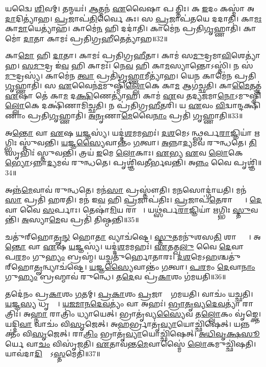 𑌯𑌦𑍍𑌵𑍈 \ul{𑌶𑌿}𑌵𑌮𑍍।
𑌤𑌨𑍍𑌮𑌯𑌃॑।
\ul{𑌆}𑌤𑍍𑌮𑌨॑ \ul{𑌏}𑌵𑍈𑌷𑌾 𑌪𑌰𑍀᳚𑌤𑍍𑌤𑌿𑌃।
𑌕 \ul{𑌇}𑌦𑌂 𑌕𑌸𑍍𑌮𑌾॑ 𑌅\ul{𑌦𑌾}𑌦𑌿𑌤𑍍𑌯𑌾॑𑌹।
\ul{𑌪𑍍𑌰}𑌜𑌾𑌪॑\ul{𑌤𑌿}𑌰𑍍𑌵𑍈 𑌕𑌃।
𑌸 \ul{𑌪𑍍𑌰}𑌜𑌾𑌪॑𑌤𑌯𑍇 𑌦𑌦𑌾𑌤𑌿।
𑌕𑌾\ul{𑌮𑌃} 𑌕𑌾\ul{𑌮𑌾}𑌯𑍇𑌤𑍍𑌯𑌾॑𑌹।
𑌕𑌾𑌮𑍇॑\ul{𑌨} 𑌹𑌿 𑌦𑌦𑌾॑𑌤𑌿।
𑌕𑌾𑌮𑍇॑𑌨 𑌪𑍍𑌰𑌤𑌿\ul{𑌗𑍃}𑌹𑍍𑌣𑌾𑌤𑌿॑।
𑌕𑌾𑌮𑍋॑ \ul{𑌦𑌾}𑌤𑌾 𑌕𑌾𑌮𑌃॑ 𑌪𑍍𑌰𑌤𑌿𑌗𑍍𑌰\ul{𑌹𑍀}𑌤𑍇𑌤𑍍𑌯𑌾॑𑌹॥32॥

𑌕𑌾\ul{𑌮𑍋} 𑌹𑌿 \ul{𑌦𑌾}𑌤𑌾।
𑌕𑌾𑌮𑌃॑ 𑌪𑍍𑌰𑌤𑌿𑌗𑍍𑌰\ul{𑌹𑍀}𑌤𑌾।
𑌕𑌾𑌮॑ 𑌸\ul{𑌮𑍁}𑌦𑍍𑌰𑌮𑌾\ul{𑌵𑌿}𑌶𑍇\-𑌤𑍍𑌯𑌾॑𑌹।
\ul{𑌸}\ul{𑌮𑍁}𑌦𑍍𑌰 𑌇॑\ul{𑌵} 𑌹𑌿 𑌕𑌾𑌮𑌃॑।
𑌨𑍇\ul{𑌵} 𑌹𑌿 𑌕𑌾\ul{𑌮}𑌸𑍍𑌯𑌾𑌨𑍍𑌤𑍋\-𑌽𑌸𑍍𑌤𑌿॑।
𑌨 𑌸॑\ul{𑌮𑍁}𑌦𑍍𑌰𑌸𑍍𑌯॑।
𑌕𑌾𑌮𑍇॑𑌨 \ul{𑌤𑍍𑌵𑌾} 𑌪𑍍𑌰𑌤𑌿॑\-𑌗𑍃\ul{𑌹𑍍𑌣𑌾}𑌮𑍀𑌤𑍍𑌯𑌾॑𑌹।
𑌯𑍇\ul{𑌨} 𑌕𑌾𑌮𑍇॑𑌨 𑌪𑍍𑌰𑌤𑌿\ul{𑌗𑍃}𑌹𑍍𑌣𑌾𑌤𑌿॑।
𑌸 \ul{𑌏}𑌵𑍈𑌨॑\ul{𑌮}𑌮𑍁𑌷𑍍𑌮𑌿𑌁॑\ul{𑌲𑍍𑌲𑍋}𑌕𑍇 𑌕𑌾\ul{𑌮} 𑌆𑌗॑𑌚𑍍𑌛𑌤𑌿।
𑌕𑌾\ul{𑌮𑍈}𑌤𑌤𑍍𑌤॑ \ul{𑌏}𑌷𑌾 𑌤𑍇॑ 𑌕𑌾\ul{𑌮} 𑌦\ul{𑌕𑍍𑌷𑌿}𑌣𑍇𑌤𑍍𑌯𑌾॑𑌹।
𑌕𑌾𑌮॑ \ul{𑌏}𑌵 𑌤𑌦𑍍𑌯𑌜॑𑌮𑌾\ul{𑌨𑍋}\-𑌽𑌮𑍁𑌷𑍍𑌮𑌿𑌁॑\ul{𑌲𑍍𑌲𑍋}𑌕𑍇 𑌦𑌕𑍍𑌷𑌿॑𑌣𑌾𑌮𑌿𑌚𑍍𑌛𑌤𑌿।
𑌨 𑌪𑍍𑌰॑𑌤𑌿𑌗𑍍𑌰\ul{𑌹𑍀}𑌤𑌰𑌿॑।
𑌯 \ul{𑌏}𑌵𑌂 \ul{𑌵𑌿}𑌦𑍍𑌵𑌾𑌨𑍍𑌦𑌕𑍍𑌷𑌿॑𑌣𑌾𑌂 𑌪𑍍𑌰𑌤𑌿\ul{𑌗𑍃}𑌹𑍍𑌣𑌾𑌤𑌿॑।
\ul{𑌅}\ul{𑌨𑍃}𑌣𑌾\ul{𑌮𑍇}𑌵𑍈\ul{𑌨𑌾𑌂} 𑌪𑍍𑌰𑌤𑌿॑ 𑌗𑍃𑌹𑍍𑌣𑌾𑌤𑌿॥33॥\anuvakamend[\ul{𑌵𑍍𑌲𑍀}\ul{𑌨𑌾}𑌤𑍍𑌯\ul{𑌶𑍍𑌵}𑌮𑌿𑌤𑍍𑌯𑌾॑𑌹𑌾𑌙𑍍𑌗𑍀\ul{𑌰}𑌸𑌃 𑌪𑍍𑌰॑𑌤𑌿𑌗𑍍𑌰\ul{𑌹𑍀}𑌤𑍍𑌰 𑌇𑌤𑍍𑌯𑌾॑𑌹 𑌪𑍍𑌰𑌤𑌿𑌗𑍍𑌰\ul{𑌹𑍀}𑌤𑍇𑌤𑍍𑌯𑌾॑\ul{𑌹} 𑌦\ul{𑌕𑍍𑌷𑌿}𑌣𑍇𑌤𑍍𑌯𑌾॑𑌹 \ul{𑌚}𑌤𑍍𑌵𑌾𑌰𑌿॑ 𑌚]

𑌅\ul{𑌨𑍍𑌤𑍋} 𑌵𑌾 \ul{𑌏}𑌷 \ul{𑌯}𑌜𑍍𑌞𑌸𑍍𑌯॑।
𑌯𑌦𑍍𑌦॑\ul{𑌶}𑌮𑌮𑌹𑌃॑।
\ul{𑌦}\ul{𑌶}𑌮𑍇\-𑌽𑌹᳚𑌨𑍍𑌥𑍍𑌸𑌰𑍍𑌪\ul{𑌰𑌾}𑌜𑍍𑌞𑌿𑌯𑌾॑ \ul{𑌋}𑌗𑍍𑌭𑌿𑌃 𑌸𑍍𑌤𑍁॑𑌵𑌨𑍍𑌤𑌿।
\ul{𑌯}𑌜𑍍𑌞\ul{𑌸𑍍𑌯𑍈}𑌵𑌾𑌨𑍍𑌤𑌂॑ \ul{𑌗}𑌤𑍍𑌵𑌾।
\ul{𑌅}𑌨𑍍𑌨𑌾\ul{𑌦𑍍𑌯}𑌮𑌵॑ 𑌰𑍁𑌨𑍍𑌧𑌤𑍇।
\ul{𑌤𑌿}𑌸𑍃𑌭𑌿𑌃॑ 𑌸𑍍𑌤𑍁𑌵𑌨𑍍𑌤𑌿।
𑌤𑍍𑌰𑌯॑ \ul{𑌇}𑌮𑍇 \ul{𑌲𑍋}𑌕𑌾𑌃।
\ul{𑌏}𑌭𑍍𑌯 \ul{𑌏}𑌵 \ul{𑌲𑍋}𑌕𑍇\ul{𑌭𑍍𑌯𑍋}\-𑌽𑌨𑍍𑌨𑌾\ul{𑌦𑍍𑌯}𑌮𑌵॑ 𑌰𑍁𑌨𑍍𑌧𑌤𑍇।
𑌪𑍃𑌶𑍍𑌞𑌿॑𑌵𑌤𑍀𑌰𑍍𑌭𑌵𑌨𑍍𑌤𑌿।
𑌅\ul{𑌨𑍍𑌨𑌂} 𑌵𑍈 𑌪𑍃𑌶𑍍𑌞𑌿॑॥34॥

𑌅𑌨𑍍𑌨॑\ul{𑌮𑍇}𑌵𑌾𑌵॑ 𑌰𑍁𑌨𑍍𑌧𑌤𑍇।
𑌮𑌨॑\ul{𑌸𑌾} 𑌪𑍍𑌰𑌸𑍍𑌤𑍗॑𑌤𑌿।
𑌮\ul{𑌨}𑌸𑍋𑌦𑍍𑌗𑌾॑𑌯𑌤𑌿।
𑌮𑌨॑\ul{𑌸𑌾} 𑌪𑍍𑌰𑌤𑌿॑ 𑌹𑌰𑌤𑌿।
𑌮𑌨॑ 𑌇\ul{𑌵} 𑌹𑌿 \ul{𑌪𑍍𑌰}𑌜𑌾𑌪॑𑌤𑌿𑌃।
\ul{𑌪𑍍𑌰}𑌜𑌾𑌪॑\ul{𑌤𑍇}𑌰𑌾𑌪𑍍𑌤𑍍𑌯𑍈᳚।
\ul{𑌦𑍇}𑌵𑌾 𑌵𑍈 \ul{𑌸}𑌰𑍍𑌪𑌾𑌃।
𑌤𑍇𑌷𑌾॑\ul{𑌮𑌿}𑌯 𑌰𑌾𑌜𑍍𑌞𑍀᳚।
𑌯𑌥𑍍𑌸॑𑌰𑍍𑌪\ul{𑌰𑌾}𑌜𑍍𑌞𑌿𑌯𑌾॑ \ul{𑌋}𑌗𑍍𑌭𑌿𑌃 \ul{𑌸𑍍𑌤𑍁}𑌵𑌨𑍍𑌤𑌿॑।
\ul{𑌅}𑌸𑍍𑌯𑌾\ul{𑌮𑍇}𑌵 𑌪𑍍𑌰𑌤𑌿॑ 𑌤𑌿𑌷𑍍𑌠𑌨𑍍𑌤𑌿॥35॥

𑌚𑌤𑍁॑𑌰𑍍‌\mbox{}𑌹𑍋\ul{𑌤𑍄}\ul{𑌨𑍍} 𑌹𑍋\ul{𑌤𑌾} 𑌵𑍍𑌯𑌾𑌚॑𑌷𑍍𑌟𑍇।
\ul{𑌸𑍍𑌤𑍁}𑌤𑌮𑌨𑍁॑𑌶𑌸\ul{𑌤𑌿} 𑌶𑌾𑌨𑍍𑌤𑍍𑌯𑍈᳚।
𑌅\ul{𑌨𑍍𑌤𑍋} 𑌵𑌾 \ul{𑌏}𑌷 \ul{𑌯}𑌜𑍍𑌞𑌸𑍍𑌯॑।
𑌯𑌦𑍍𑌦॑\ul{𑌶}𑌮𑌮𑌹𑌃॑।
\ul{𑌏}𑌤𑌤𑍍𑌖\ul{𑌲𑍁} 𑌵𑍈 \ul{𑌦𑍇}𑌵𑌾𑌨𑌾𑌂᳚ 𑌪\ul{𑌰}𑌮𑌂 𑌗𑍁\ul{𑌹𑍍𑌯𑌂} 𑌬𑍍𑌰𑌹𑍍𑌮॑।
𑌯𑌚𑍍𑌚𑌤𑍁॑𑌰𑍍\mbox{}𑌹𑍋𑌤𑌾𑌰𑌃।
\ul{𑌦}\ul{𑌶}𑌮𑍇\-𑌽\ul{𑌹}\ul{}𑌶𑍍𑌚𑌤𑍁॑𑌰𑍍\-‌𑌹𑍋\ul{𑌤𑍄}𑌨𑍍𑌵𑍍𑌯𑌾𑌚॑𑌷𑍍𑌟𑍇।
\ul{𑌯}𑌜𑍍𑌞\ul{𑌸𑍍𑌯𑍈}𑌵𑌾𑌨𑍍𑌤𑌂॑ \ul{𑌗}𑌤𑍍𑌵𑌾।
\ul{𑌪}\ul{𑌰}𑌮𑌂 \ul{𑌦𑍇}𑌵𑌾\ul{𑌨𑌾𑌂} 𑌗𑍁\ul{𑌹𑍍𑌯𑌂} 𑌬𑍍𑌰𑌹𑍍𑌮𑌾𑌵॑ 𑌰𑍁𑌨𑍍𑌧𑍇।
𑌤\ul{𑌦𑍇}𑌵 𑌪𑍍𑌰॑\ul{𑌕𑌾}𑌶𑌂 𑌗॑𑌮𑌯𑌤𑌿॥36॥

𑌤𑌦𑍇॑𑌨𑌂 𑌪𑍍𑌰\ul{𑌕𑌾}𑌶𑌂 \ul{𑌗}𑌤𑌮𑍍।
\ul{𑌪𑍍𑌰}\ul{𑌕𑌾}𑌶𑌂 \ul{𑌪𑍍𑌰}𑌜𑌾𑌨𑌾𑌂᳚ 𑌗𑌮𑌯𑌤𑌿।
𑌵𑌾𑌚𑌂॑ 𑌯𑌚𑍍𑌛𑌤𑌿।
\ul{𑌯}𑌜𑍍𑌞\ul{𑌸𑍍𑌯} 𑌧𑍃𑌤𑍍𑌯𑍈᳚।
\ul{𑌯}\ul{𑌜}\ul{𑌮𑌾}\ul{𑌨}\ul{𑌦𑍇}\ul{𑌵}𑌤𑍍𑌯𑌂॑ 𑌵𑌾 𑌅𑌹𑌃॑।
\ul{𑌭𑍍𑌰𑌾}\ul{𑌤𑍃}\ul{𑌵𑍍𑌯}\ul{𑌦𑍇}\ul{𑌵}𑌤𑍍𑌯𑌾॑ 𑌰𑌾𑌤𑍍𑌰𑌿𑌃॑।
𑌅\ul{𑌹𑍍𑌨𑌾} 𑌰𑌾𑌤𑍍𑌰𑌿𑌂॑ 𑌧𑍍𑌯𑌾𑌯𑍇𑌤𑍍।
𑌭𑍍𑌰𑌾𑌤𑍃॑𑌵𑍍𑌯\ul{𑌸𑍍𑌯𑍈}𑌵 𑌤\ul{𑌲𑍍𑌲𑍋}𑌕𑌂 𑌵𑍃॑𑌙𑍍𑌕𑍍𑌤𑍇।
𑌯𑌦𑍍𑌦𑌿\ul{𑌵𑌾} 𑌵𑌾𑌚𑌂॑ 𑌵𑌿\ul{𑌸𑍃}𑌜𑍇𑌤𑍍।
𑌅\ul{𑌹}𑌰𑍍𑌭𑍍𑌰𑌾𑌤𑍃॑\ul{𑌵𑍍𑌯𑌾}𑌯𑍋𑌚𑍍𑌛𑌿॑𑌷𑍇𑌤𑍍।
𑌯𑌨𑍍𑌨𑌕𑍍𑌤𑌂॑ 𑌵𑌿\ul{𑌸𑍃}𑌜𑍇𑌤𑍍।
𑌰𑌾\ul{𑌤𑍍𑌰𑌿𑌂} 𑌭𑍍𑌰𑌾𑌤𑍃॑\ul{𑌵𑍍𑌯𑌾}𑌯𑍋𑌚𑍍𑌛𑌿॑𑌷𑍇𑌤𑍍।
\ul{𑌅}\ul{𑌧𑌿}\ul{𑌵𑍃}\ul{𑌕𑍍𑌷}\ul{𑌸𑍂}𑌰𑍍𑌯𑍇 𑌵𑌾\ul{𑌚𑌂} 𑌵𑌿𑌸𑍃॑𑌜𑌤𑌿।
\ul{𑌏}𑌤𑌾𑌵॑𑌨𑍍𑌤\ul{𑌮𑍇}𑌵𑌾𑌸𑍍𑌮𑍈॑ \ul{𑌲𑍋}𑌕𑌮𑍁𑌚𑍍𑌛𑌿॑𑌷𑌤𑌿।
𑌯𑌾𑌵॑𑌦𑌾\ul{𑌦𑌿}𑌤𑍍𑌯𑍋᳚\-𑌽\ul{𑌸𑍍𑌤}𑌮𑍇𑌤𑌿॑॥37॥

